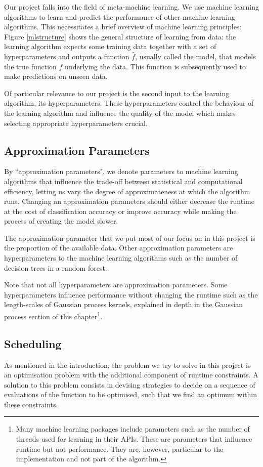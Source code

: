 \documentclass[a4paper,12pt,twoside,openright]{report}
\begin{document}
Our project falls into the field of meta-machine learning. We use machine learning algorithms to learn and predict the performance of other machine learning algorithms. This necessitates a brief overview of machine learning principles: Figure \ref{mlstructure} shows the general structure of learning from data: the learning algorithm expects some training data together with a set of hyperparameters and outputs a function $\hat{f}$, usually called the model, that models the true function $f$ underlying the data. This function is subsequently used to make predictions on unseen data.

Of particular relevance to our project is the second input to the learning algorithm, its hyperparameters. These hyperparameters control the behaviour of the learning algorithm and influence the quality of the model which makes selecting appropriate hyperparameters crucial.


\subsection{Approximation Parameters}
By ``approximation parameters", we denote parameters to machine learning algorithms that influence the trade-off between statistical and computational efficiency, letting us vary the degree of approximateness at which the algorithm runs. Changing an approximation parameters should either decrease the runtime at the cost of classification accuracy or improve accuracy while making the process of creating the model slower. 

The approximation parameter that we put most of our focus on in this project is the proportion of the available data. Other approximation parameters are hyperparameters to the machine learning algorithms such as the number of decision trees in a random forest.

Note that not all hyperparameters are approximation parameters. Some hyperparameters influence performance without changing the runtime such as the length-scales of Gaussian process kernels, explained in depth in the Gaussian process section of this chapter\footnote{Many machine learning packages include parameters such as the number of threads used for learning in their APIs. These are parameters that influence runtime but not performance. They are, however, particular to the implementation and not part of the algorithm.}.

\subsection{Scheduling}
As mentioned in the introduction, the problem we try to solve in this project is an optimisation problem with the additional component of runtime constraints. A solution to this problem consists in devising strategies to decide on a sequence of evaluations of the function to be optimised, such that we find an optimum within these constraints. 
\end{document}
